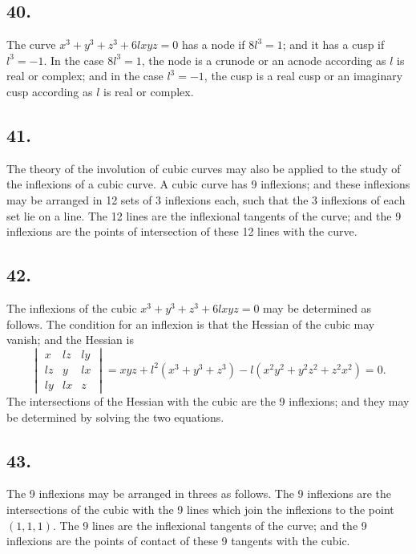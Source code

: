 \documentclass[11pt,a4paper]{article}
\theoremstyle{definition}
\begin{document}
\subsection*{40.}

The curve $x^{3} + y^{3} + z^{3} + 6lxyz = 0$ has a node if $8l^{3} = 1$; and it has a cusp if $l^{3} = -1$.
In the case $8l^{3} = 1$, the node is a crunode or an acnode according as $l$ is real or complex;
and in the case $l^{3} = -1$, the cusp is a real cusp or an imaginary cusp according as $l$ is real
or complex.

\newpage
\subsection*{41.}

The theory of the involution of cubic curves may also be applied to the study of the
inflexions of a cubic curve. A cubic curve has 9 inflexions; and these inflexions may be
arranged in 12 sets of 3 inflexions each, such that the 3 inflexions of each set lie on a line.
The 12 lines are the inflexional tangents of the curve; and the 9 inflexions are the points
of intersection of these 12 lines with the curve.

\subsection*{42.}

The inflexions of the cubic $x^{3} + y^{3} + z^{3} + 6lxyz = 0$ may be determined as follows.
The condition for an inflexion is that the Hessian of the cubic may vanish; and the
Hessian is
\[
\begin{vmatrix}
x & l z & l y \\
l z & y & l x \\
l y & l x & z
\end{vmatrix}
= xyz + l^{2}(x^{3} + y^{3} + z^{3}) - l(x^{2}y^{2} + y^{2}z^{2} + z^{2}x^{2}) = 0.
\]
The intersections of the Hessian with the cubic are the 9 inflexions; and they may be
determined by solving the two equations.

\newpage
\subsection*{43.}

The 9 inflexions may be arranged in threes as follows. The 9 inflexions are the
intersections of the cubic with the 9 lines which join the inflexions to the point
$(1, 1, 1)$. The 9 lines are the inflexional tangents of the curve; and the 9 inflexions are
the points of contact of these 9 tangents with the cubic.
\end{document}
